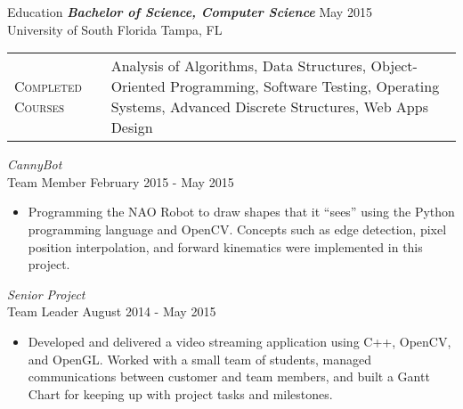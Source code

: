 \begin{section}{Education}
  {\sl \textbf{Bachelor of Science, Computer Science}} \hfill May 2015 \\
  University of South Florida \hfill Tampa, FL \\
  \begin{tabularx}{\linewidth}{@{}l X@{}}
    \textsc{Completed Courses} &\small{Analysis of Algorithms, Data Structures, Object-Oriented Programming, Software Testing, Operating Systems, Advanced Discrete Structures, Web Apps Design}\\
  \end{tabularx}
  {\sl CannyBot} \\ Team Member \hfill February 2015 - May 2015
  \begin{itemize}
  \item Programming the NAO Robot to draw shapes that it ``sees'' using the Python programming language and OpenCV. Concepts such as edge detection, pixel position interpolation, and forward kinematics were implemented in this project.
  \end{itemize}
  {\sl Senior Project}  \\ Team Leader \hfill August 2014 - May 2015
  \begin{itemize}
  \item Developed and delivered a video streaming application using C++, OpenCV, and OpenGL. Worked with a small team of students, managed communications between customer and team members, and built a Gantt Chart for keeping up with project tasks and milestones.
  \end{itemize}
\end{section}
